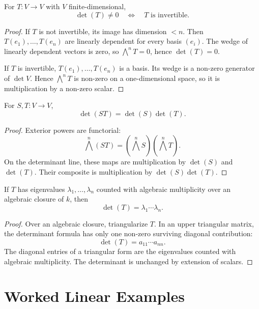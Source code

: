 \documentclass[11pt]{memoir}
\begin{document}
\begin{proposition}
\label{prop:det-invertibility}
For \(T:V\to V\) with \(V\) finite-dimensional,
\[
  \det(T)\neq 0
  \quad\Longleftrightarrow\quad
  T\text{ is invertible}.
\]
\end{proposition}

\begin{proof}
If \(T\) is not invertible, its image has dimension \(<n\). Then
\(T(e_1),\dots,T(e_n)\) are linearly dependent for every basis
\((e_i)\). The wedge of linearly dependent vectors is zero, so
\(\bigwedge^nT=0\), hence \(\det(T)=0\).

If \(T\) is invertible, \(T(e_1),\dots,T(e_n)\) is a basis. Its wedge
is a non-zero generator of \(\det V\). Hence
\(\bigwedge^nT\) is non-zero on a one-dimensional space, so it is
multiplication by a non-zero scalar.
\end{proof}

\begin{proposition}[multiplicativity]
\label{prop:multiplicativity}
For \(S,T:V\to V\),
\[
  \det(ST)=\det(S)\det(T).
\]
\end{proposition}

\begin{proof}
Exterior powers are functorial:
\[
  \bigwedge^n(ST)=(\bigwedge^nS)(\bigwedge^nT).
\]
On the determinant line, these maps are multiplication by
\(\det(S)\) and \(\det(T)\). Their composite is multiplication by
\(\det(S)\det(T)\).
\end{proof}

\begin{proposition}
\label{prop:eigenvalue-product}
If \(T\) has eigenvalues \(\lambda_1,\dots,\lambda_n\) counted with
algebraic multiplicity over an algebraic closure of \(k\), then
\[
  \det(T)=\lambda_1\cdots\lambda_n.
\]
\end{proposition}

\begin{proof}
Over an algebraic closure, triangularize \(T\). In an upper triangular
matrix, the determinant formula has only one non-zero surviving
diagonal contribution:
\[
  \det(T)=a_{11}\cdots a_{nn}.
\]
The diagonal entries of a triangular form are the eigenvalues counted
with algebraic multiplicity. The determinant is unchanged by extension
of scalars.
\end{proof}

\section{Worked Linear Examples}
\label{sec:worked-linear-examples}
\end{document}
